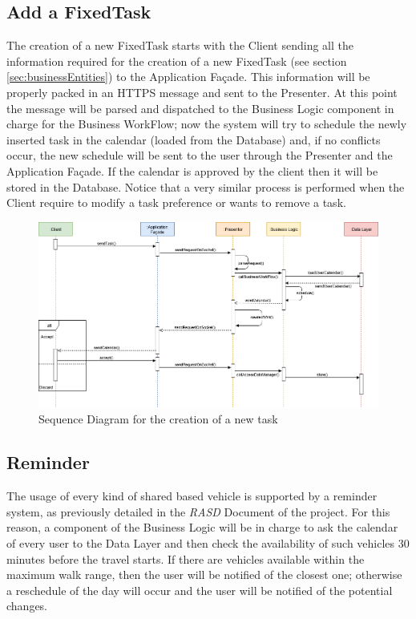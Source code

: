 \subsection{Add a FixedTask}
The creation of a new FixedTask starts with the Client sending all the information required for the creation of a new FixedTask (see section \ref{sec:businessEntities}) to the Application Façade. This information will be properly packed in an HTTPS message and sent to the Presenter. At this point the message will be parsed and dispatched to the Business Logic component in charge for the Business WorkFlow; now the system will try to schedule the newly inserted task in the calendar (loaded from the Database) and, if no conflicts occur, the new schedule will be sent to the user through the Presenter and the Application Façade. If the calendar is approved by the client then it will be stored in the Database.
Notice that a very similar process is performed when the Client require to modify a task preference or wants to remove a task. 

\begin{figure}[H]
    \centering
    \includegraphics[scale=0.4]{Pictures/RunTimeView/addTask.png}
    \caption{Sequence Diagram for the creation of a new task}
    \label{fig:sequenceAddTask}
\end{figure}

\subsection{Reminder}
The usage of every kind of shared based vehicle is supported by a reminder system, as previously detailed in the \emph{RASD} Document of the project. For this reason, a component of the Business Logic will be in charge to ask the calendar of every user to the Data Layer and then check the availability of such vehicles 30 minutes before the travel starts. If there are vehicles available within the maximum walk range, then the user will be notified of the closest one; otherwise a reschedule of the day will occur and the user will be notified of the potential changes. 



